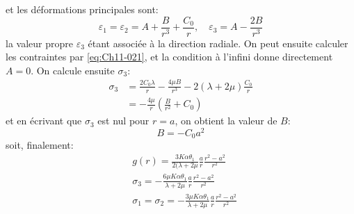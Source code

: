 et les déformations principales sont: 
\begin{equation}
    \varepsilon_1 = \varepsilon_2 = A + \frac{B}{r^3} + \frac{C_0}{r},\quad \varepsilon_3 = A - \frac{2B}{r^3}
    \label{eq:Ch11-048}
\end{equation}
la valeur propre $\varepsilon_3$ étant associée à la direction radiale.
On peut ensuite calculer les contraintes par \eqref{eq:Ch11-021}, et la condition à l'infini donne directement $A= 0$.
On calcule ensuite $\sigma_3$: 
\begin{equation}
  \begin{aligned}
    \sigma_3 & = \frac{2C_0\lambda}{r} - \frac{4\mu B}{r^3} - 2(\lambda+2\mu)\frac{C_0}{r} \\
             & = - \frac{4\mu}{r}\left(\frac{B}{r^2}+C_0\right)
  \end{aligned}
    \label{eq:Ch11-049}
\end{equation}
et en écrivant que $\sigma_3$ est nul pour $r=a$, on obtient la valeur de $B$:  
\begin{equation}
    B = - C_0 a^2
    \label{eq:Ch11-050}
\end{equation}
soit, finalement:
\begin{equation}
  \begin{aligned}
   & g(r)                 = \frac{3K\alpha \theta_1}{2(\lambda + 2\mu}\frac{a}{r}\frac{r^2-a^2}{r^2} \\
   & \sigma_3             = - \frac{6\mu K \alpha \theta_1}{\lambda + 2\mu} \frac{a}{r}\frac{r^2-a^2}{r^2}\\
   & \sigma_1 = \sigma_2  = - \frac{3\mu K \alpha \theta_1}{\lambda + 2\mu} \frac{a}{r}\frac{r^2-a^2}{r^2}
  \end{aligned}
    \label{eq:Ch11-051}
\end{equation}
